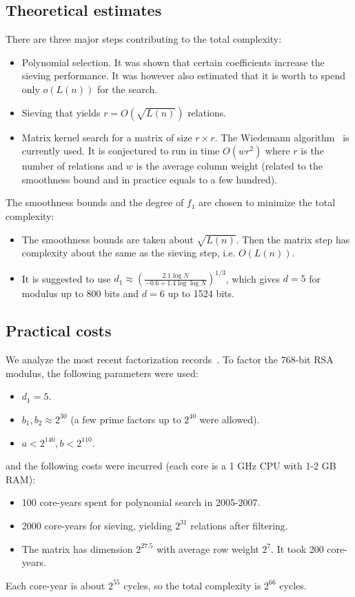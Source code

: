 \documentclass[a4paper]{article}
\begin{document}
\subsection{Theoretical estimates}
There are three major steps contributing to the total complexity:
\begin{itemize}
    \item Polynomial selection. It was shown that certain coefficients increase the sieving performance. It was however also estimated that it is worth to spend only $o(L(n))$ for the search.
    \item Sieving that yields $r=O(\sqrt{L(n)})$ relations. 
    \item Matrix kernel search for a matrix of size $r\times r$. The Wiedemann algorithm~\cite{DBLP:journals/tit/Wiedemann86} is currently used. It is conjectured to run in time $O(wr^2)$ where $r$ is the number of relations and $w$ is the average column weight (related to the smoothness bound and in practice equals to a few hundred).
\end{itemize}
The smoothness bounds and the degree of $f_1$ are chosen to minimize the total complexity:
\begin{itemize}
    \item The smoothness bounds are taken about $\sqrt{L(n)}$. Then the matrix step has complexity about the same as the sieving step, i.e. $O(L(n))$.
    \item It is suggested to use 
$d_1 \approx \left(\frac{2.1\log N}{-0.6+1.4\log \log N }\right)^{1/3}$, which gives $d=5$ for modulus up to 800 bits and $d=6$ up to 1524 bits. 
\end{itemize}

\subsection{Practical costs} We analyze the most recent factorization records~\cite{DBLP:conf/crypto/KleinjungAFLTBGKMORTZ10,DBLP:journals/iacr/BaiTZ12,factor795}. To factor the 768-bit RSA modulus, the following parameters were used:
\begin{itemize}
    \item $d_1= 5$.
    \item $b_1,b_2 \approx 2^{30}$ (a few prime factors up to $2^{40}$ were allowed). 
    \item $a<2^{140}, b<2^{110}$.
\end{itemize}
and the following costs were incurred (each core is a 1 GHz CPU with 1-2 GB RAM):
\begin{itemize}
    \item 100 core-years spent for polynomial search in 2005-2007.
    \item 2000 core-years for sieving, yielding $2^{31}$ relations after filtering.
    \item The matrix has dimension $2^{27.5}$  with average row weight $2^7$. It took 200 core-years.
\end{itemize}
Each core-year is about $2^{55}$ cycles, so the total complexity is $2^{66}$ cycles. 
\end{document}
